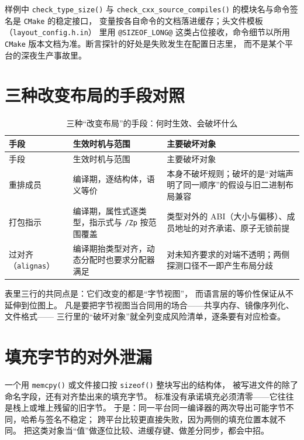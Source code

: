 \documentclass[12pt,a4paper,fontset=fandol]{ctexbook}
\newcommand{\Fn}[1]{\texttt{#1()}}
\newcommand{\Tp}[1]{\texttt{#1}}
\newcommand{\Bk}{\discretionary{}{}{}}
\newcommand{\Tool}[1]{\texttt{#1}}
\newcommand{\Sw}[1]{\texttt{#1}}
\begin{document}
样例中 \Fn{check\_type\_size} 与 \Fn{check\_cxx\_source\_compiles}
的模块名与命令签名是 \Tool{CMake} 的稳定接口，
变量按各自命令的文档落进缓存；头文件模板（\Tp{layout{\Bk}\_config.h.in}）
里用 \Tp{@SIZEOF{\Bk}\_LONG@} 这类占位接收，命令细节以所用
\Tool{CMake} 版本文档为准。断言探针的好处是失败发生在配置日志里，
而不是某个平台的深夜生产事故里。

\section{三种改变布局的手段对照}\label{sec:cl11-means-table}

\begin{longtable}{@{}>{\raggedright\arraybackslash}p{} >{\raggedright\arraybackslash}p{} >{\raggedright\arraybackslash}p{}@{}}
\caption{三种“改变布局”的手段：何时生效、会破坏什么}\label{tab:cl11-layout-means}\\
\toprule
手段 & 生效时机与范围 & 主要破坏对象 \\
\midrule
\endfirsthead
\toprule
手段 & 生效时机与范围 & 主要破坏对象 \\
\midrule
\endhead
\bottomrule
\endfoot
重排成员 & 编译期，逐结构体，语义等价 & 本身不破坏规则；破坏的是“对端声明了同一顺序”的假设与旧二进制布局兼容 \\
打包指示 & 编译期，属性式逐类型，指示式与 \Sw{/Zp} 按范围覆盖 & 类型对外的 ABI（大小与偏移）、成员地址的对齐承诺、原子无锁前提 \\
过对齐（\Tp{alignas}） & 编译期抬类型对齐，动态分配时也要求分配器满足 & 对未知齐要求的对端不透明；两侧探测口径不一即产生布局分歧 \\
\end{longtable}

表里三行的共同点是：它们改变的都是“字节视图”，
而语言层的等价性保证从不延伸到位图上。
凡是要把字节视图当合同用的场合——共享内存、镜像序列化、文件格式——
三行里的“破坏对象”就全列变成风险清单，逐条要有对应检查。

\section{填充字节的对外泄漏}\label{sec:cl11-padding-leak}

\begin{abibox}[title={把带填充的结构体整体写出去}]
一个用 \Fn{memcpy} 或文件接口按 \Fn{sizeof} 整块写出的结构体，
被写进文件的除了命名字段，还有对齐垫出来的填充字节。
标准没有承诺填充必须清零——它往往是栈上或堆上残留的旧字节。
于是：同一平台同一编译器的两次导出可能字节不同，哈希与签名不稳定；
跨平台比较更直接失败，因为两侧的填充位置本就不同。
把这类对象当“值”做逐位比较、进缓存键、做差分同步，都会中招。
\end{abibox}
\end{document}
